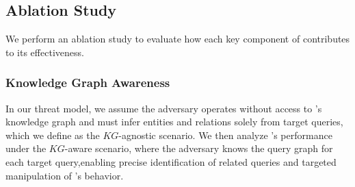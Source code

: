 \subsection{Ablation Study}


We perform an ablation study to evaluate how each key component of \attack contributes to its  effectiveness.

\subsubsection{Knowledge Graph Awareness}
\label{sec:abl_kgaware}
In our threat model, we assume the adversary operates without access to \rag's knowledge graph and must infer entities and relations solely from target queries, which we define as the $KG$-agnostic scenario. We then analyze \attack’s performance under the $KG$-aware scenario, where the adversary knows the query graph for each target query,enabling precise identification of related queries and targeted manipulation of \rag’s behavior.




